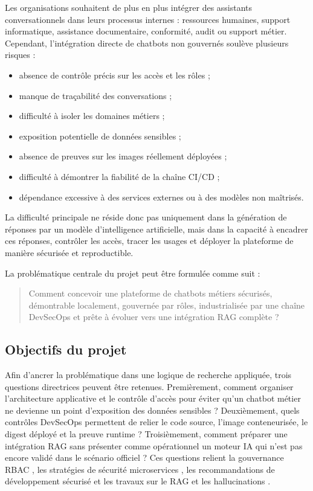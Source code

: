 Les organisations souhaitent de plus en plus intégrer des assistants conversationnels dans leurs processus internes : ressources humaines, support informatique, assistance documentaire, conformité, audit ou support métier. Cependant, l’intégration directe de chatbots non gouvernés soulève plusieurs risques :

\begin{itemize}
    \item absence de contrôle précis sur les accès et les rôles ;
    \item manque de traçabilité des conversations ;
    \item difficulté à isoler les domaines métiers ;
    \item exposition potentielle de données sensibles ;
    \item absence de preuves sur les images réellement déployées ;
    \item difficulté à démontrer la fiabilité de la chaîne CI/CD ;
    \item dépendance excessive à des services externes ou à des modèles non maîtrisés.
\end{itemize}

La difficulté principale ne réside donc pas uniquement dans la génération de réponses par un modèle d’intelligence artificielle, mais dans la capacité à encadrer ces réponses, contrôler les accès, tracer les usages et déployer la plateforme de manière sécurisée et reproductible.

La problématique centrale du projet peut être formulée comme suit :

\begin{quote}
Comment concevoir une plateforme de chatbots métiers sécurisés, démontrable localement, gouvernée par rôles, industrialisée par une chaîne DevSecOps et prête à évoluer vers une intégration RAG complète ?
\end{quote}

\subsection{Objectifs du projet}
Afin d’ancrer la problématique dans une logique de recherche appliquée, trois questions directrices peuvent être retenues. Premièrement, comment organiser l’architecture applicative et le contrôle d’accès pour éviter qu’un chatbot métier ne devienne un point d’exposition des données sensibles ? Deuxièmement, quels contrôles DevSecOps permettent de relier le code source, l’image conteneurisée, le digest déployé et la preuve runtime ? Troisièmement, comment préparer une intégration RAG sans présenter comme opérationnel un moteur IA qui n’est pas encore validé dans le scénario officiel ? Ces questions relient la gouvernance RBAC \cite{sandhu_rbac_1996}, les stratégies de sécurité microservices \cite{nist_sp_800_204}, les recommandations de développement sécurisé \cite{nist_ssdf_800_218} et les travaux sur le RAG et les hallucinations \cite{lewis_rag_2020,gao_rag_survey_2024,ji_hallucination_survey_2023}.

